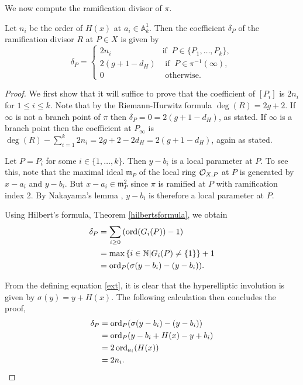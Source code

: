 We now compute the ramification divisor of $\pi$.


    \begin{lem}\label{char2ramification}
    Let $n_i$ be the order of $H(x)$ at $a_i\in \mathbb A_k^1$.
    Then the coefficient $\delta_P$ of the ramification divisor $R$ at $P\in X$ is given by
        \[
        \delta_P = \left\{
            \begin{array}{ll}
            2n_i & \text{if }\ P\in \{P_1,\ldots ,P_k\}, \\
            2(g+1-d_H) & \text{ if }\  P \in \pi^{-1}(\infty), \\
            0 & \text{ otherwise.} 
            \end{array}
        \right.
        \]
    \end{lem}
    \begin{proof}
    We first show that it will suffice to prove that the coefficient of $[P_i]$ is $2n_i$ for $1\leq i \leq k$.
    Note that by the Riemann-Hurwitz formula $\deg(R) = 2g+2$.
    If $\infty$ is not a branch point of $\pi$ then $\delta_P = 0 = 2(g+1-d_H)$, as stated.
    If $\infty$ is a branch point then the coefficient at $P_\infty$ is $\deg(R) - \sum_{i=1}^k2n_i = 2g+2-2d_H = 2(g+1-d_H)$, again as stated.
    
    Let $P=P_i$ for some $i\in \{1,\ldots , k\}$.
    Then $y-b_i$ is a local parameter at $P$.
    To see this, note that the maximal ideal $\mathfrak m_{P}$ of the local ring ${\cal O}_{X,P}$ at $P$ is generated by $x-a_i$ and $y-b_i$.
    But $x-a_i\in \mathfrak m_{P}^2$ since $\pi$ is ramified at $P$ with ramification index 2.
    By Nakayama's lemma \cite[Prop. 2.6]{atiyahmacdonald}, $y-b_i$ is therefore a local parameter at $P$.
    
    Using Hilbert's formula, Theorem \ref{hilbertsformula}, we obtain
        \begin{align*}
        \delta_P & =  \sum_{i\geq 0} \left(\operatorname{ord}(G_i(P))-1\right) \\
        & =  \max\left\{ i\in {\mathbb N} | G_i(P)\neq \{1\}\right\} + 1 \\
        & =  \operatorname{ord}_{P}(\sigma(y-b_i) - (y-b_i)).
        \end{align*}
    
    From the defining equation \eqref{ext}, it is clear that the hyperelliptic involution is given by $\sigma(y)=y+H(x)$.
    The following calculation then concludes the proof,
        \begin{align*}
        \delta_P & =  \operatorname{ord}_{P}(\sigma(y-b_i) - (y-b_i)) \\
        & =  \operatorname{ord}_{P}(y-b_i+H(x) - y + b_i) \\
        & =  2\operatorname{ord}_{a_i}(H(x)) \\
        & =  2n_i.\qedhere
        \end{align*}
    \end{proof}


